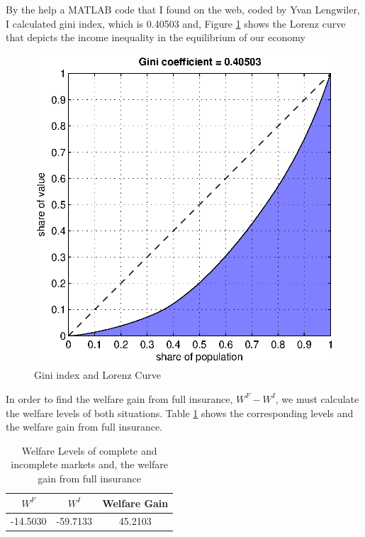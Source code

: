\documentclass[a4paper,10pt,12pt]{article}%
\begin{document}
By the help a MATLAB code that I found on the web, coded by Yvan Lengwiler, I calculated gini index, which is 0.40503 and, Figure \ref{gini} shows the Lorenz curve that depicts the income inequality in the equilibrium of our economy
\begin{figure}[H]
\centering
   \includegraphics[scale=1]{gini.eps} 
  \begin{center}
   \caption{Gini index and Lorenz Curve}
   \label{gini}
  \end{center}
\end{figure}
In order to find the welfare gain from full insurance, $W^F-W^I$, we must calculate the welfare levels of both situations. Table \ref{tab:welfaregain} shows the corresponding levels and the welfare gain from full insurance.
\begin{table}[htbp]
  \centering
  \caption{Welfare Levels of complete and incomplete markets and, the welfare gain from full insurance}
    \begin{tabular}{|c|c|c|}
    \hline
    $W^F$     & $W^I$     & Welfare Gain      \\
    \hline
    \hline
      -14.5030 &  -59.7133 &  45.2103 \\
    \hline
    \end{tabular}%
  \label{tab:welfaregain}%
\end{table}%
\end{document}
